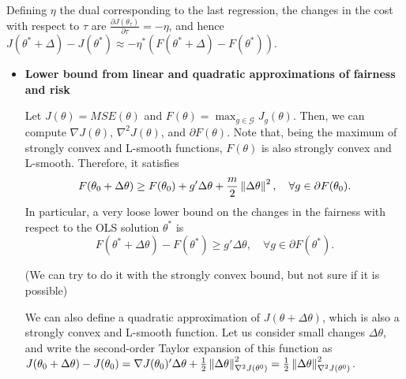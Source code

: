 \documentclass{article}
\newcommand{\G}{\mathcal{G}}
\begin{document}
Defining $\eta$ the dual corresponding to the last regression, the changes in the cost with respect to $\tau$ are $\frac{\partial J(\theta_\tau)}{\partial \tau}=-\eta$, and hence $J(\theta^* + \Delta) - J(\theta^*) \approx -\eta^* (F(\theta^* + \Delta) - F(\theta^*))$.

\begin{itemize}
    \item \textbf{Lower bound from linear and quadratic approximations of fairness and risk}

    Let $J(\theta)=MSE(\theta)$ and  $F(\theta)=\max_{g\in \G} J_g(\theta)$. Then, we can compute $\nabla J(\theta)$, $\nabla ^2J(\theta)$, and $\partial F(\theta)$. Note that, being the maximum of strongly convex and L-smooth functions, $F(\theta)$ is also strongly convex and L-smooth. Therefore, it satisfies
    $$F(\theta_0 + \Delta \theta)\geq F(\theta_0) + g'\Delta \theta + \frac{m}{2}\norm[]{\Delta \theta}^2, \quad \forall g \in \partial F(\theta_0).$$
    In particular, a very loose lower bound on the changes in the fairness with respect to the OLS solution $\theta^*$ is 
    $$
    F(\theta^* + \Delta \theta)- F(\theta^*) \geq g'\Delta \theta, \quad \forall g \in \partial F(\theta^*). 
    $$

    {\color{red} (We can try to do it with the strongly convex bound, but not sure if it is possible)}

    We can also define a quadratic approximation of $J(\theta + \Delta \theta)$, which is also a strongly convex and L-smooth function. Let us consider small changes $\Delta \theta$, and write the second-order Taylor expansion of this function as 
    $J(\theta_0 + \Delta \theta) - J(\theta_0) = \nabla J(\theta_0)'
    \Delta \theta + \frac{1}{2} \norm[\nabla^2J(\theta^0)]{\Delta \theta}^2= \frac{1}{2} \norm[\nabla^2J(\theta^0)]{\Delta \theta}^2$.
    

\end{itemize}
\end{document}
